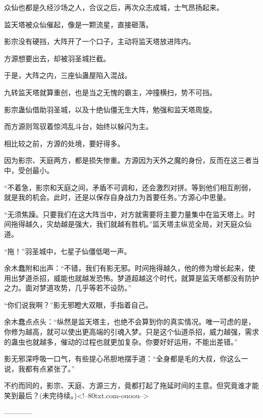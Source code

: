 \begin{this_body}
众仙也都是久经沙场之人，合议之后，再次众志成城，士气昂扬起来。

监天塔被众仙催起，像是一颗流星，直接砸落。

影宗没有硬挡，大阵开了一个口子，主动将监天塔放进阵内。

方源想要出去，却被羽圣城拦截。

于是，大阵之内，三座仙蛊屋陷入混战。

九转监天塔就算重创，也是当之无愧的霸主，冲撞横扫，势不可挡。

影宗蛊仙借助羽圣城，以及十绝仙僵无生大阵，勉强和监天塔周旋。

而方源则驾驭着惊鸿乱斗台，始终以躲闪为主。

相比较之前，方源的处境，要好得多。

因为影宗、天庭两方，都是损失惨重。方源因为天外之魔的身份，反而在这三者当中，受创最小。

“不着急，影宗和天庭之间，矛盾不可调和，还会激烈对拼。等到他们相互削弱，就是我的机会。此时，还是以保存自身战力为首要任务。”方源心中思量。

“无须焦躁。只要我们在这大阵当中，对方就需要将主要力量集中在监天塔上。时间拖得越久，灾劫越是强大，我们就越有胜机。”监天塔主纵览全局，对天庭众仙道。

“拖！”羽圣城中，七星子仙僵低喝一声。

余木蠢附和出声：“不错，我们有影无邪。时间拖得越久，他的修为增长起来，使用出梦道杀招，威能也就越发恐怖。梦道超越这个时代，就算是监天塔都没有防护之力。面对梦道攻势，几乎等若不设防。”

“你们说我啊？”影无邪瞪大双眼，手指着自己。

余木蠢点点头：“纵然是监天塔主，也绝不会算到你的真实情况。唯一可虑的是，你修为越高，就可以使出更高端的引魂入梦。只是这个仙道杀招，威力越强，需求的蛊虫也就越多，催动的过程也就更加复杂。你要好好运用，不能出差错。”

影无邪深呼吸一口气，有些提心吊胆地摆手道：“全身都是毛的大叔，你这么一说，我都有点紧张了。”

不约而同的，影宗、天庭、方源三方，竟都打起了拖延时间的主意。但究竟谁才能笑到最后？(未完待续。)<!--80txt.com-ouoou-->

------------

\end{this_body}

